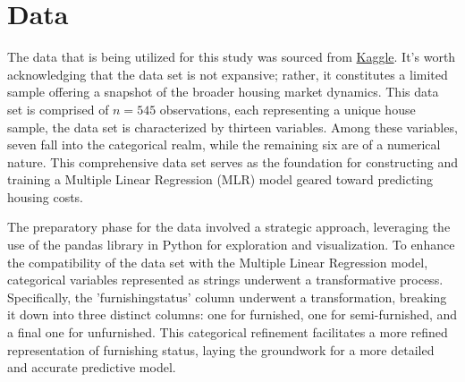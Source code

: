 \documentclass[12pt]{article}
\begin{document}
\section{Data}
\label{sec:data}


The data that is being utilized for this study was sourced from \href{https://www.kaggle.com/code/ashydv/housing-price-prediction-linear-regression/input}{Kaggle}. It's worth acknowledging that the data set is not expansive; rather, it constitutes a limited sample offering a snapshot of the broader housing market dynamics. This data set is comprised of \(n = 545\) observations, each representing a unique house sample, the data set is characterized by thirteen variables. Among these variables, seven fall into the categorical realm, while the remaining six are of a numerical nature. This comprehensive data set serves as the foundation for constructing and training a Multiple Linear Regression (MLR) model geared toward predicting housing costs.

The preparatory phase for the data involved a strategic approach, leveraging the use of the pandas library in Python for exploration and visualization. To enhance the compatibility of the data set with the Multiple Linear Regression model, categorical variables represented as strings underwent a transformative process. Specifically, the 'furnishingstatus' column underwent a transformation, breaking it down into three distinct columns: one for furnished, one for semi-furnished, and a final one for unfurnished. This categorical refinement facilitates a more refined representation of furnishing status, laying the groundwork for a more detailed and accurate predictive model.

\bigskip
\end{document}
